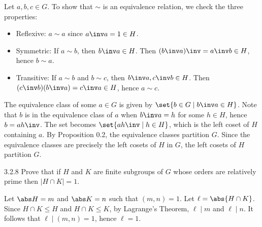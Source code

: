 \begin{sol}[spsol]
    Let $a, b, c \in G$.
	To show that $\sim$ is an equivalence relation, we check the three properties:
    \begin{itemize}
        \item Reflexive: $a \sim a$ since $a\inv a = 1 \in H$.
        \item Symmetric: If $a \sim b$, then $b\inv a \in H$.
	Then $(b\inv a)\inv = a\inv b \in H$, hence $b \sim a$.
        \item Transitive: If $a \sim b$ and $b \sim c$, then $b\inv a, c\inv b \in H$.
	Then $(c\inv b)(b\inv a) = c\inv a \in H$, hence $a \sim c$.
    \end{itemize}

    The equivalence class of some $a \in G$ is given by $\set{b \in G \mid b\inv a \in H}$.
	Note that $b$ is in the equivalence class of $a$ when $b\inv a = h$ for some $h \in H$, hence $b = ah\inv$.
	The set becomes $\set{ah\inv \mid h \in H}$, which is the left coset of $H$ containing $a$.
	By Proposition 0.2, the equivalence classes partition $G$.
	Since the equivalence classes are precisely the left cosets of $H$ in $G$, the left cosets of $H$ partition $G$.
\end{sol}

\begin{exercise}{3.2.8}
    Prove that if $H$ and $K$ are finite subgroups of $G$ whose orders are relatively prime then $|H \cap K| = 1$.
\end{exercise}

\begin{sol}
    Let $\abs H = m$ and $\abs K = n$ such that $(m, n) = 1$.
	Let $\ell = \abs{H \cap K}$.
	Since $H \cap K \leq H$ and $H \cap K \leq K$, by Lagrange's Theorem, $\ell \mid m$ and $\ell \mid n$.
	It follows that $\ell \mid (m, n) = 1$, hence $\ell = 1$.
\end{sol}

